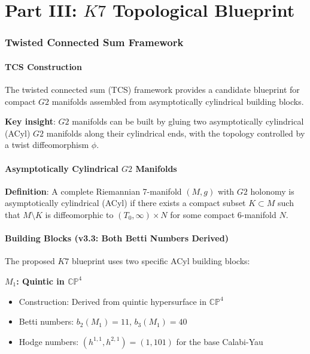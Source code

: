 \documentclass[11pt,a4paper]{article}
\newcommand{\Gtwo}{\mathrm{G}_2}
\newcommand{\Kseven}{K_7}
\def\Gtwo{G2}%
\def\Kseven{K7}%
\begin{document}
\newpage
\part*{Part III: $\Kseven$ Topological Blueprint}

\section{Twisted Connected Sum Framework}

\subsection{TCS Construction}

The twisted connected sum (TCS) framework provides a candidate blueprint for compact $\Gtwo$ manifolds assembled from asymptotically cylindrical building blocks.

\textbf{Key insight}: $\Gtwo$ manifolds can be built by gluing two asymptotically cylindrical (ACyl) $\Gtwo$ manifolds along their cylindrical ends, with the topology controlled by a twist diffeomorphism $\phi$.

\subsection{Asymptotically Cylindrical $\Gtwo$ Manifolds}

\textbf{Definition}: A complete Riemannian 7-manifold $(M, g)$ with $\Gtwo$ holonomy is asymptotically cylindrical (ACyl) if there exists a compact subset $K \subset M$ such that $M \setminus K$ is diffeomorphic to $(T_0, \infty) \times N$ for some compact 6-manifold $N$.

\subsection{Building Blocks (v3.3: Both Betti Numbers Derived)}

The proposed $\Kseven$ blueprint uses two specific ACyl building blocks:

\textbf{$M_1$: Quintic in $\mathbb{CP}^4$}
\begin{itemize}
\item Construction: Derived from quintic hypersurface in $\mathbb{CP}^4$
\item Betti numbers: $b_2(M_1) = 11$, $b_3(M_1) = 40$
\item Hodge numbers: $(h^{1,1}, h^{2,1}) = (1, 101)$ for the base Calabi-Yau
\end{itemize}
\end{document}
